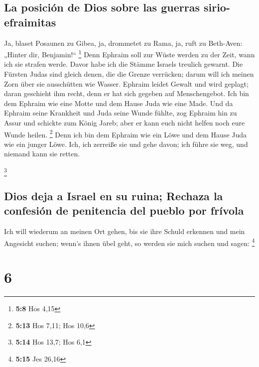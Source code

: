 \hypertarget{la-posiciuxf3n-de-dios-sobre-las-guerras-sirio-efraimitas}{%
\subsection{La posición de Dios sobre las guerras
sirio-efraimitas}\label{la-posiciuxf3n-de-dios-sobre-las-guerras-sirio-efraimitas}}

 Ja, blaset Posaunen zu Gibea, ja, drommetet zu Rama, ja,
ruft zu Beth-Aven: „Hinter dir, Benjamin!{}`` \footnote{\textbf{5:8} Hos
  4,15}  Denn Ephraim soll zur Wüste werden zu der Zeit,
wann ich sie strafen werde. Davor habe ich die Stämme Israels treulich
gewarnt.  Die Fürsten Judas sind gleich denen, die die
Grenze verrücken; darum will ich meinen Zorn über sie ausschütten wie
Wasser.  Ephraim leidet Gewalt und wird geplagt; daran
geschieht ihm recht, denn er hat sich gegeben auf Menschengebot.
 Ich bin dem Ephraim wie eine Motte und dem Hause Juda
wie eine Made.  Und da Ephraim seine Krankheit und Juda
seine Wunde fühlte, zog Ephraim hin zu Assur und schickte zum König
Jareb; aber er kann euch nicht helfen noch eure Wunde heilen.
\footnote{\textbf{5:13} Hos 7,11; Hos 10,6}  Denn ich bin
dem Ephraim wie ein Löwe und dem Hause Juda wie ein junger Löwe. Ich,
ich zerreiße sie und gehe davon; ich führe sie weg, und niemand kann sie
retten.

\footnote{\textbf{5:14} Hos 13,7; Hos 6,1}

\hypertarget{dios-deja-a-israel-en-su-ruina-rechaza-la-confesiuxf3n-de-penitencia-del-pueblo-por-fruxedvola}{%
\subsection{Dios deja a Israel en su ruina; Rechaza la confesión de
penitencia del pueblo por
frívola}\label{dios-deja-a-israel-en-su-ruina-rechaza-la-confesiuxf3n-de-penitencia-del-pueblo-por-fruxedvola}}

 Ich will wiederum an meinen Ort gehen, bis sie ihre
Schuld erkennen und mein Angesicht suchen; wenn's ihnen übel geht, so
werden sie mich suchen und sagen: \footnote{\textbf{5:15} Jes 26,16}

\hypertarget{section-5}{%
\section{6}\label{section-5}}

